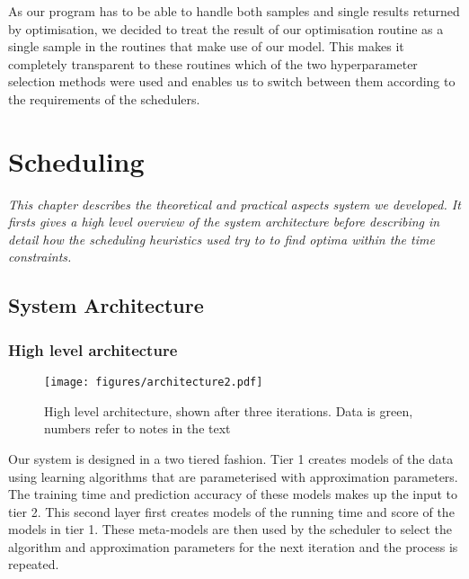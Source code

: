 \documentclass[a4paper,12pt,twoside,openright]{report}
\begin{document}
As our program has to be able to handle both samples and single results returned by optimisation, we decided to treat the result of our optimisation routine as a single sample in the routines that make use of our model. This makes it completely transparent to these routines which of the two hyperparameter selection methods were used and enables us to switch between them according to the requirements of the schedulers.



\chapter{Scheduling} 



\textit{This chapter describes the theoretical and practical aspects system we developed. It firsts gives a high level overview of the system architecture before describing in detail how the scheduling heuristics used try to to find optima within the time constraints.}

\section{System Architecture} %




\subsection{High level architecture}
\begin{figure}[p]
    \centering
    \texttt{[image: figures/architecture2.pdf]}
    
  \caption{High level architecture, shown after three iterations. Data is green, numbers refer to notes in the text}
    \label{architecture}
\end{figure}

Our system is designed in a two tiered fashion. Tier 1 creates models of the data using learning algorithms that are parameterised with approximation parameters. The training time and prediction accuracy of these models makes up the input to tier 2. This second layer first creates models of the running time and score of the models in tier 1. These meta-models are then used by the scheduler to select the algorithm and approximation parameters for the next iteration and the process is repeated.
\end{document}
